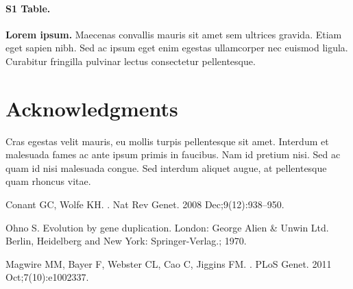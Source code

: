 \documentclass[10pt,letterpaper]{article}
\begin{document}
\paragraph*{S1 Table.}
\label{S1_Table}
{\bf Lorem ipsum.} Maecenas convallis mauris sit amet sem ultrices gravida. Etiam eget sapien nibh. Sed ac ipsum eget enim egestas ullamcorper nec euismod ligula. Curabitur fringilla pulvinar lectus consectetur pellentesque.

\section*{Acknowledgments}
Cras egestas velit mauris, eu mollis turpis pellentesque sit amet. Interdum et malesuada fames ac ante ipsum primis in faucibus. Nam id pretium nisi. Sed ac quam id nisi malesuada congue. Sed interdum aliquet augue, at pellentesque quam rhoncus vitae.

\nolinenumbers

%
%
% 
\begin{thebibliography}{10}

Conant GC, Wolfe KH.
.
\newblock Nat Rev Genet. 2008 Dec;9(12):938--950.

Ohno S.
\newblock Evolution by gene duplication.
\newblock London: George Alien \& Unwin Ltd. Berlin, Heidelberg and New York:
  Springer-Verlag.; 1970.

Magwire MM, Bayer F, Webster CL, Cao C, Jiggins FM.
.
\newblock PLoS Genet. 2011 Oct;7(10):e1002337.

\end{thebibliography}
\end{document}
